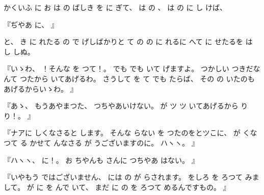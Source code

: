 %
かくいふ
に
お
は
の
ばしき
を
に
ぎて、
%
は
の
、
%
は
の
に
し
けば、

%
『ぢやあ
に、
』

%
と、
%
き
に
れたる
の
で
げしばかりと
て
の
の%
に
れるに
へて
に
せたるを
は
し
しぬ。

%
『いゝわ、
%
！そんな
を
つて！。
%
でも
でも
いて
げますよ。
%
つかしい
つきだなんて
つたから
いてあげるわ。
%
さうして
を
て
でも
たらば、
%
その
の
いたのもあげるからいゝわ。
』

%
『あゝ、
%
もうあやまつた、
%
つちやあいけない。
%
が
ツ
ツ
いてあげるから
り
り！。
』

%
『ナアに
しくなさると
します。
%
そんな
らない
を
つたのをとツこに、
%
が
くなつて
る
かせて
んなさる
が
うございますのに。
%
ハヽヽ。
』

%
『ハヽヽ、
%
に！。%
%
お
ちやんも
さんに
つちやあ
はない。
』

%
『いやもう
ではございません、
%
には
の
が
らされます。
%
をしろ
を
ろつて
みまして。
%
が
に
を
んで
いて、
%
まだ
に
の
を
ろつて
めるんですもの。
』

